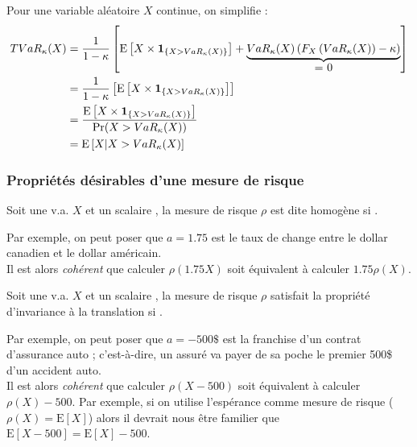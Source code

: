 \documentclass[10pt, french]{article}
\begin{document}
\begin{multicols*}{2}
Pour une variable aléatoire $X$ continue, on simplifie :
\begin{align*}
	TVaR_{\kappa}(X)
	&=	\frac{1}{1 - \kappa}\left[	\text{E}\left[X \times \bm{1}_{\{X	>	VaR_{\kappa}(X)\}}\right] + \underbrace{VaR_{\kappa}(X) \left(F_{X}\left(VaR_{\kappa}(X)\right)	-	\kappa\right)}_{\shortstack{= 0}}	\right]	\\
	&=	\frac{1}{1 - \kappa}\left[	\text{E}\left[X \times \bm{1}_{\{X	>	VaR_{\kappa}(X)\}}\right]	\right]	\\
	&=	\frac{\text{E}\left[X \times \bm{1}_{\{X	>	VaR_{\kappa}(X)\}}\right]}{\Pr(X	>	VaR_{\kappa}(X))}	\\
	&=	\esp{X | X	>	VaR_{\kappa}(X)}
\end{align*}

\subsubsection{Propriétés désirables d'une mesure de risque}
\begin{definitionNOHFILLsub}[Homogénéité]
Soit une v.a. $X$ et un scalaire , la mesure de risque $\rho$ est dite homogène si .

\begin{rappel_enhanced}[Interprétation]
Par exemple, on peut poser que $a	=	1.75$ est le taux de change entre le dollar canadien et le dollar américain.\\
Il est alors \textit{cohérent} que calculer $\rho(1.75X)$ soit équivalent à calculer $1.75\rho(X)$.
\end{rappel_enhanced}
\end{definitionNOHFILLsub}

\begin{definitionNOHFILLsub}
Soit une v.a. $X$ et un scalaire , la mesure de risque $\rho$ satisfait la propriété d'invariance à la translation si .	\\

\begin{rappel_enhanced}[Interprétation]
Par exemple, on peut poser que $a	=	-500\$$ est la franchise d'un contrat d'assurance auto ; c'est-à-dire, un assuré va payer de sa poche le premier 500\$ d'un accident auto.\\

Il est alors \textit{cohérent} que calculer $\rho(X - 500)$ soit équivalent à calculer $\rho(X) - 500$. Par exemple, si on utilise l'espérance comme mesure de risque ($\rho(X)	=	\text{E}[X]$) alors  il devrait nous être familier que $\text{E}[X	-	500]	=	\text{E}[X]	-	500$.
\end{rappel_enhanced}
\end{definitionNOHFILLsub}


\end{multicols*}
\end{document}
